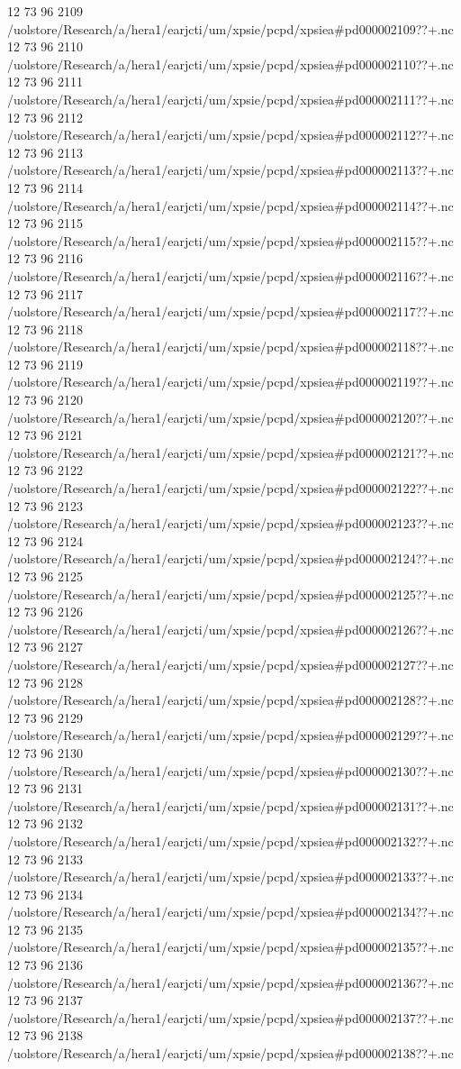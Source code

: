 12 73 96
2109
/uolstore/Research/a/hera1/earjcti/um/xpsie/pcpd/xpsiea#pd000002109??+.nc
12 73 96
2110
/uolstore/Research/a/hera1/earjcti/um/xpsie/pcpd/xpsiea#pd000002110??+.nc
12 73 96
2111
/uolstore/Research/a/hera1/earjcti/um/xpsie/pcpd/xpsiea#pd000002111??+.nc
12 73 96
2112
/uolstore/Research/a/hera1/earjcti/um/xpsie/pcpd/xpsiea#pd000002112??+.nc
12 73 96
2113
/uolstore/Research/a/hera1/earjcti/um/xpsie/pcpd/xpsiea#pd000002113??+.nc
12 73 96
2114
/uolstore/Research/a/hera1/earjcti/um/xpsie/pcpd/xpsiea#pd000002114??+.nc
12 73 96
2115
/uolstore/Research/a/hera1/earjcti/um/xpsie/pcpd/xpsiea#pd000002115??+.nc
12 73 96
2116
/uolstore/Research/a/hera1/earjcti/um/xpsie/pcpd/xpsiea#pd000002116??+.nc
12 73 96
2117
/uolstore/Research/a/hera1/earjcti/um/xpsie/pcpd/xpsiea#pd000002117??+.nc
12 73 96
2118
/uolstore/Research/a/hera1/earjcti/um/xpsie/pcpd/xpsiea#pd000002118??+.nc
12 73 96
2119
/uolstore/Research/a/hera1/earjcti/um/xpsie/pcpd/xpsiea#pd000002119??+.nc
12 73 96
2120
/uolstore/Research/a/hera1/earjcti/um/xpsie/pcpd/xpsiea#pd000002120??+.nc
12 73 96
2121
/uolstore/Research/a/hera1/earjcti/um/xpsie/pcpd/xpsiea#pd000002121??+.nc
12 73 96
2122
/uolstore/Research/a/hera1/earjcti/um/xpsie/pcpd/xpsiea#pd000002122??+.nc
12 73 96
2123
/uolstore/Research/a/hera1/earjcti/um/xpsie/pcpd/xpsiea#pd000002123??+.nc
12 73 96
2124
/uolstore/Research/a/hera1/earjcti/um/xpsie/pcpd/xpsiea#pd000002124??+.nc
12 73 96
2125
/uolstore/Research/a/hera1/earjcti/um/xpsie/pcpd/xpsiea#pd000002125??+.nc
12 73 96
2126
/uolstore/Research/a/hera1/earjcti/um/xpsie/pcpd/xpsiea#pd000002126??+.nc
12 73 96
2127
/uolstore/Research/a/hera1/earjcti/um/xpsie/pcpd/xpsiea#pd000002127??+.nc
12 73 96
2128
/uolstore/Research/a/hera1/earjcti/um/xpsie/pcpd/xpsiea#pd000002128??+.nc
12 73 96
2129
/uolstore/Research/a/hera1/earjcti/um/xpsie/pcpd/xpsiea#pd000002129??+.nc
12 73 96
2130
/uolstore/Research/a/hera1/earjcti/um/xpsie/pcpd/xpsiea#pd000002130??+.nc
12 73 96
2131
/uolstore/Research/a/hera1/earjcti/um/xpsie/pcpd/xpsiea#pd000002131??+.nc
12 73 96
2132
/uolstore/Research/a/hera1/earjcti/um/xpsie/pcpd/xpsiea#pd000002132??+.nc
12 73 96
2133
/uolstore/Research/a/hera1/earjcti/um/xpsie/pcpd/xpsiea#pd000002133??+.nc
12 73 96
2134
/uolstore/Research/a/hera1/earjcti/um/xpsie/pcpd/xpsiea#pd000002134??+.nc
12 73 96
2135
/uolstore/Research/a/hera1/earjcti/um/xpsie/pcpd/xpsiea#pd000002135??+.nc
12 73 96
2136
/uolstore/Research/a/hera1/earjcti/um/xpsie/pcpd/xpsiea#pd000002136??+.nc
12 73 96
2137
/uolstore/Research/a/hera1/earjcti/um/xpsie/pcpd/xpsiea#pd000002137??+.nc
12 73 96
2138
/uolstore/Research/a/hera1/earjcti/um/xpsie/pcpd/xpsiea#pd000002138??+.nc
